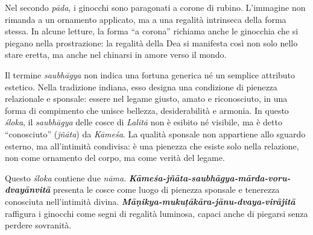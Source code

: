 Nel secondo \textit{pāda}, i ginocchi sono paragonati a corone di rubino. L’immagine non rimanda a un ornamento applicato, ma a una regalità intrinseca della forma stessa. In alcune letture, la forma “a corona” richiama anche le ginocchia che si piegano nella prostrazione: la regalità della Dea si manifesta così non solo nello stare eretta, ma anche nel chinarsi in amore verso il mondo.

Il termine \textit{saubhāgya} non indica una fortuna generica né un semplice attributo estetico. Nella tradizione indiana, esso designa una condizione di pienezza relazionale e sponsale: essere nel legame giusto, amato e riconosciuto, in una forma di compimento che unisce bellezza, desiderabilità e armonia. In questo \textit{śloka}, il \textit{saubhāgya} delle cosce di \textit{Lalitā} non è esibito né visibile, ma è detto “conosciuto” (\textit{jñāta}) da \textit{Kāmeśa}. La qualità sponsale non appartiene allo sguardo esterno, ma all’intimità condivisa: è una pienezza che esiste solo nella relazione, non come ornamento del corpo, ma come verità del legame.

Questo \textit{śloka} contiene due \textit{nāma}.  
\textbf{\textit{Kāmeśa-jñāta-saubhāgya-mārda-voru-dvayānvitā}} presenta le cosce come luogo di pienezza sponsale e tenerezza conosciuta nell’intimità divina.  
\textbf{\textit{Māṇikya-mukuṭākāra-jānu-dvaya-virājitā}} raffigura i ginocchi come segni di regalità luminosa, capaci anche di piegarsi senza perdere sovranità.
